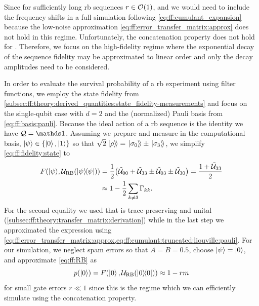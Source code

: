 Since for sufficiently long \gls{rb} sequences $r\in\order{1}$, and we would need to include the frequency shifts \freqshifts in a full simulation following \cref{eq:ff:cumulant_expansion} because the low-noise approximation \cref{eq:ff:error_transfer_matrix:approx} does not hold in this regime.
Unfortunately, the concatenation property does not hold for \freqshifts.
Therefore, we focus on the high-fidelity regime where the exponential decay of the sequence fidelity may be approximated to linear order and only the decay amplitudes \decayamps need to be considered.

In order to evaluate the survival probability of a \gls{rb} experiment using filter functions, we employ the state fidelity from \cref{subsec:ff:theory:derived_quantities:state_fidelity-measurements} and focus on the single-qubit case with $d = 2$ and the (normalized) Pauli basis from \cref{eq:ff:basis:pauli}.
Because the ideal action of a \gls{rb} sequence is the identity we have $\liouvQ = \eye$.
Assuming we prepare and measure in the computational basis, $\mbox{\ensuremath{\ket{\psi}}}\in\lbrace\ket{0}, \ket{1}\rbrace$ so that $\sqrt{2}\dket{\rho} = \dket{\sigma_0}\pm\dket{\sigma_3}$, we simplify \cref{eq:ff:fidelity:state} to
\begin{equation}\label{eq:ff:fidelity:state:RB}
\begin{split}
    F(\mbox{\ensuremath{\ket{\psi}}}, \mathcal{U}_{\mathrm{RB}}(\op{\psi})) &= \frac{1}{2}\bigl(\mathcal{\tilde{U}}_{00} +
    \mathcal{\tilde{U}}_{33}\pm
    \mathcal{\tilde{U}}_{03}\pm
    \mathcal{\tilde{U}}_{30}\bigr)
    = \frac{1 + \mathcal{\tilde{U}}_{33}}{2} \\
    &\approx 1 - \frac{1}{2}\sum_{k\neq 3}\Gamma_{kk}.
\end{split}
\end{equation}
For the second equality we used that \liouvUe is trace-preserving and unital (\cf \cref{subsec:ff:theory:transfer_matrix:derivation}) while in the last step we approximated the expression using \cref{eq:ff:error_transfer_matrix:approx,eq:ff:cumulant:truncated:liouville:pauli}.
For our simulation, we neglect \acrshort{spam} errors so that $A =  B =  0.5$, choose $\mbox{\ensuremath{\ket{\psi}}} = \ket{0}$, and approximate \cref{eq:ff:RB} as
\begin{equation}\label{eq:ff:fidelity:state:RB:fit}
p(\ket{0}) = F(\ket{0}, \mathcal{U}_{\mathrm{RB}}(\op{0}))\approx 1 - rm
\end{equation}
for small gate errors $r\ll 1$ since this is the regime which we can efficiently simulate using the concatenation property.


